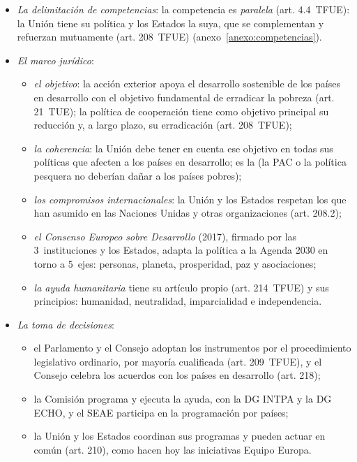 \documentclass[11pt]{article}
\begin{document}
\begin{itemize}
\begin{itemize}
  \end{itemize}
\item \emph{La delimitación de competencias}: la competencia es \emph{paralela} (art. 4.4~TFUE): la Unión tiene su política y los Estados la suya, que se complementan y refuerzan mutuamente (art. 208~TFUE) (anexo~\ref{anexo:competencias}).
\item \emph{El marco jurídico}:
  \begin{itemize}
  \item \emph{el objetivo}: la acción exterior apoya el desarrollo sostenible de los países en desarrollo con el objetivo fundamental de erradicar la pobreza (art. 21~TUE); la política de cooperación tiene como objetivo principal su reducción y, a largo plazo, su erradicación (art. 208~TFUE);
  \item \emph{la coherencia}: la Unión debe tener en cuenta ese objetivo en todas sus políticas que afecten a los países en desarrollo; es la  (la PAC o la política pesquera no deberían dañar a los países pobres);
  \item \emph{los compromisos internacionales}: la Unión y los Estados respetan los que han asumido en las Naciones Unidas y otras organizaciones (art. 208.2);
  \item \emph{el Consenso Europeo sobre Desarrollo} (2017), firmado por las 3~instituciones y los Estados, adapta la política a la Agenda 2030 en torno a 5~ejes: personas, planeta, prosperidad, paz y asociaciones\nocite{UE2017Consenso};
  \item \emph{la ayuda humanitaria} tiene su artículo propio (art. 214~TFUE) y sus principios: humanidad, neutralidad, imparcialidad e independencia.
  \end{itemize}
\item \emph{La toma de decisiones}:
  \begin{itemize}
  \item el Parlamento y el Consejo adoptan los instrumentos por el procedimiento legislativo ordinario, por mayoría cualificada (art. 209~TFUE), y el Consejo celebra los acuerdos con los países en desarrollo (art. 218);
  \item la Comisión programa y ejecuta la ayuda, con la DG INTPA y la DG ECHO, y el SEAE participa en la programación por países;
  \item la Unión y los Estados coordinan sus programas y pueden actuar en común (art. 210), como hacen hoy las iniciativas Equipo Europa.
  \end{itemize}
\end{itemize}
\end{document}
